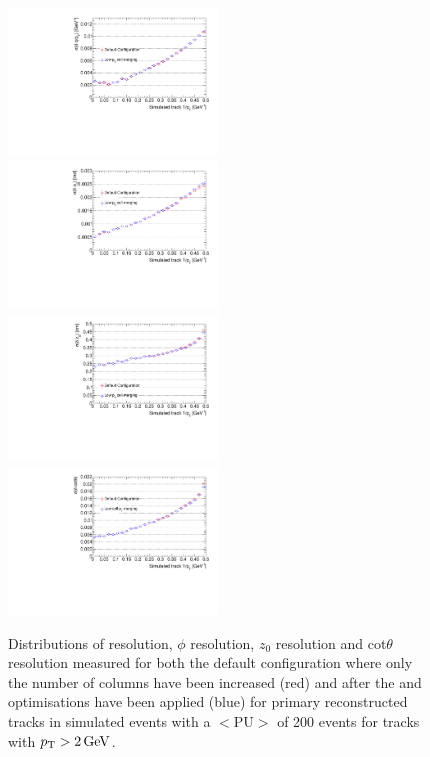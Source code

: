 \begin{figure}[htb]
\centering
\includegraphics[width=0.495\textwidth]{figs/tk-upgrade/results-lowPtTracking/qOverPtResVsInvPtFlatGeometry_5000.pdf}
\includegraphics[width=0.495\textwidth]{figs/tk-upgrade/results-lowPtTracking/phi0ResVsInvPtFlatGeometry_5000.pdf}
\\
\includegraphics[width=0.495\textwidth]{figs/tk-upgrade/results-lowPtTracking/z0ResVsInvPtFlatGeometry_5000.pdf}
\includegraphics[width=0.495\textwidth]{figs/tk-upgrade/results-lowPtTracking/cotThetaResVsInvPtFlatGeometry_5000.pdf}
\caption{
Distributions of \pt resolution, $\phi$ resolution, $z_{0}$ resolution and cot$\theta$ resolution measured for both the default configuration where only the number of \HT \qpt columns have been increased (red) and after the \HT and \KF optimisations have been applied (blue) for primary reconstructed tracks in simulated \ttbar events with a $<\textrm{PU}>$ of 200 events for tracks with $p_{\mathrm{T}} > 2\,\text{Ge\hspace{-.08em}V}$.
}
\label{fig:htHelixParametersResVsInvPt}
\end{figure}

